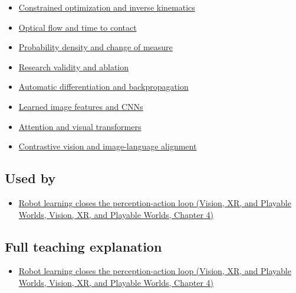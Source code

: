 \begin{itemize}
\tightlist
\item
  \hyperref[appendix-29f4bea4c2bb]{Constrained optimization and inverse kinematics}
\item
  \hyperref[appendix-e2e73f8cd93e]{Optical flow and time to contact}
\item
  \hyperref[appendix-4815cd87ab8b]{Probability density and change of measure}
\item
  \hyperref[appendix-65788587ef78]{Research validity and ablation}
\item
  \hyperref[appendix-40df0855b4a7]{Automatic differentiation and backpropagation}
\item
  \hyperref[appendix-47c51ea026fb]{Learned image features and CNNs}
\item
  \hyperref[appendix-a9d5dfdd164a]{Attention and visual transformers}
\item
  \hyperref[appendix-772f1fd96148]{Contrastive vision and image-language alignment}
\end{itemize}

\subsection{Used by}\label{appendix-b0c42da325f1-used-by}

\begin{itemize}
\tightlist
\item
  \href{../07-Vision-XR-and-Playable-Worlds/main.pdf\#nameddest=04-visual-computing-ii-ch034-robot-learning-closes-the-perception-action-loop}{Robot learning closes the perception-action loop (Vision, XR, and Playable Worlds, Vision, XR, and Playable Worlds, Chapter 4)}
\end{itemize}

\subsection{Full teaching explanation}\label{appendix-b0c42da325f1-full-teaching-explanation}

\begin{itemize}
\tightlist
\item
  \href{../07-Vision-XR-and-Playable-Worlds/main.pdf\#nameddest=04-visual-computing-ii-ch034-robot-learning-closes-the-perception-action-loop}{Robot learning closes the perception-action loop (Vision, XR, and Playable Worlds, Vision, XR, and Playable Worlds, Chapter 4)}
\end{itemize}

